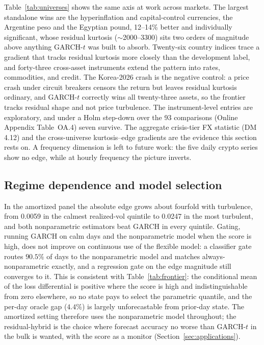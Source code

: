 \documentclass[11pt]{article}
\theoremstyle{remark}
\begin{document}
Table~\ref{tab:universes} shows the same axis at work across markets.
The largest standalone wins are the hyperinflation and capital-control
currencies, the Argentine peso and the Egyptian pound, 12--14\% better
and individually significant, whose residual kurtosis ($\sim$2000--3300)
sits two orders of magnitude above anything GARCH-$t$ was built to
absorb. Twenty-six country indices trace a gradient that tracks residual
kurtosis more closely than the development label, and forty-three cross-asset
instruments extend the pattern into rates, commodities, and credit. The
Korea-2026 crash is the negative control: a price crash under circuit
breakers censors the return but leaves residual kurtosis ordinary, and
GARCH-$t$ correctly wins all twenty-three assets, so the frontier tracks
residual shape and not price turbulence. The instrument-level entries are
exploratory, and under a Holm step-down over the 93 comparisons (Online
Appendix Table~OA.4) seven survive. The aggregate crisis-tier FX
statistic (DM 4.12) and the cross-universe kurtosis--edge gradients are
the evidence this section rests on. A frequency dimension is left to
future work: the five daily crypto series show no edge, while at hourly
frequency the picture inverts.

\subsection{Regime dependence and model selection}
\label{sec:gate}

In the amortized panel the absolute edge grows about fourfold with
turbulence, from 0.0059 in the calmest realized-vol quintile to 0.0247 in
the most turbulent, and both nonparametric estimators beat GARCH in every
quintile. Gating, running GARCH on calm days and the nonparametric model
when the score is high, does not improve on continuous use of the
flexible model: a classifier gate routes $90.5\%$ of days to the
nonparametric model and matches always-nonparametric exactly, and a
regression gate on the edge magnitude \citep{giacominiwhite2006} still
converges to it. This is consistent with Table~\ref{tab:frontier}: the
conditional mean of the loss differential is positive where the score is
high and indistinguishable from zero elsewhere, so no state pays to
select the parametric quantile, and the per-day oracle gap ($4.4\%$) is largely unforecastable from prior-day state. The amortized setting therefore uses the nonparametric
model throughout; the residual-hybrid is the choice where forecast accuracy no worse than GARCH-$t$ in the bulk is wanted, with the score as a monitor
(Section~\ref{sec:applications}).
\end{document}
